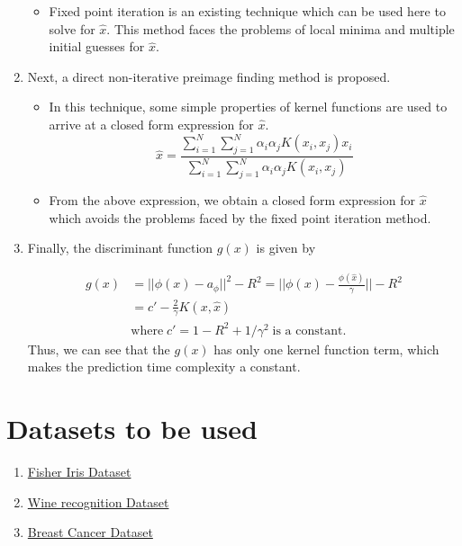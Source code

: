 \documentclass{article}
\begin{document}
\begin{enumerate}
\begin{itemize}
\item Fixed point iteration is an existing technique which can be used here to solve for $\hat{x}$. This method faces the problems of local minima and multiple initial guesses for $\hat{x}$.
\end{itemize}
\item Next, a direct non-iterative preimage finding method is proposed.
\begin{itemize}
\item In this technique, some simple properties of kernel functions are used to arrive at a closed form expression for $\hat{x}$.
\[ \hat{x} = \frac{\sum\limits_{i=1}^N \sum\limits_{j=1}^N \alpha_i \alpha_j K(x_i,x_j) x_i}{\sum\limits_{i=1}^N \sum\limits_{j=1}^N \alpha_i \alpha_j K(x_i,x_j)} \]
\item From the above expression, we obtain a closed form expression for $\hat{x}$ which avoids the problems faced by the fixed point iteration method.
\end{itemize}
\item Finally, the discriminant function $g(x)$ is given by 

\begin{equation}
\begin{split}
g(x) &= || \phi(x) - a_\phi||^2 - R^2 = ||\phi(x) - \frac{\phi(\hat{x})}{\gamma} || - R^2 \\
 &=   c' - \frac{2}{\gamma} K(x,\hat{x}) \\
 & \text{where}\;  c' = 1- R^2 + 1/\gamma^2 \; \text{is a constant}.
\end{split}
\end{equation}
Thus, we can see that the $g(x)$ has only one kernel function term, which makes the prediction time complexity a constant.
\end{enumerate}

\section{Datasets to be used}

\begin{enumerate}
\item \href{https://archive.ics.uci.edu/ml/datasets/Iris}{Fisher Iris Dataset}

\item \href{https://archive.ics.uci.edu/ml/datasets/Wine}{Wine recognition Dataset}
\item \href{https://archive.ics.uci.edu/ml/datasets/Breast+Cancer+Wisconsin+(Original)}{Breast Cancer Dataset}
\end{enumerate}
\end{document}
